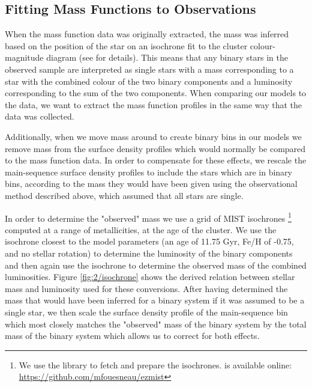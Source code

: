 \subsection{Fitting Mass Functions to Observations}

When the mass function data was originally extracted, the mass was inferred based on the position of
the star on an isochrone fit to the cluster colour-magnitude diagram (see \citealt{Sollima2017} for
details). This means that any binary stars in the observed sample are interpreted as single stars
with a mass corresponding to a star with the combined colour of the two binary components and a
luminosity corresponding to the sum of the two components. When comparing our models to the data, we
want to extract the mass function profiles in the same way that the data was collected.

Additionally, when we move mass around to create binary bins in our models we remove mass from the
surface density profiles which would normally be compared to the mass function data. In order to
compensate for these effects, we rescale the main-sequence surface density profiles to include the
stars which are in binary bins, according to the mass they would have been given using the
observational method described above, which assumed that all stars are single.

In order to determine the "observed" mass we use a grid of MIST isochrones
\citep{Dotter2016,Choi2016}\footnote{We use the  library to fetch and prepare the
isochrones.  is available online: \url{https://github.com/mfouesneau/ezmist}} computed
at a range of metallicities, at the age of the cluster. We use the isochrone closest to the model
parameters (an age of 11.75 Gyr, Fe/H of -0.75, and no stellar rotation) to determine the luminosity
of the binary components and then again use the isochrone to determine the observed mass of the
combined luminosities. Figure \ref{fig:2/isochrone} shows the derived relation between stellar mass
and luminosity used for these conversions. After having determined the mass that would have been
inferred for a binary system if it was assumed to be a single star, we then scale the surface
density profile of the main-sequence bin which most closely matches the "observed" mass of the
binary system by the total mass of the binary system which allows us to correct for both effects.


